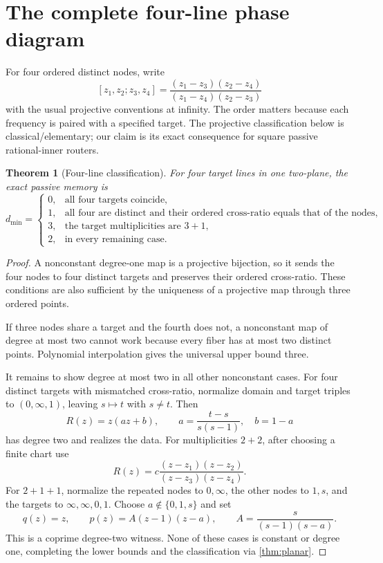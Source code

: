 \documentclass[11pt]{article}
\newtheorem{theorem}{Theorem}[section]
\theoremstyle{definition}\newtheorem{definition}[theorem]{Definition}\newtheorem{example}[theorem]{Example}
\theoremstyle{remark}\newtheorem{remark}[theorem]{Remark}\newtheorem{limitation}[theorem]{Limitation}
\begin{document}
\section{The complete four-line phase diagram}

For four ordered distinct nodes, write
\[
 [z_1,z_2;z_3,z_4]
 =\frac{(z_1-z_3)(z_2-z_4)}{(z_1-z_4)(z_2-z_3)}
\]
with the usual projective conventions at infinity.  The order matters because
each frequency is paired with a specified target.
The projective classification below is classical/elementary; our claim is its
exact consequence for square passive rational-inner routers.

\begin{theorem}[Four-line classification]\label{thm:four}
For four target lines in one two-plane, the exact passive memory is
\begin{equation}\label{eq:four}
d_{\min}=\begin{cases}
0,&\text{all four targets coincide},\\
1,&\text{all four are distinct and their ordered cross-ratio equals that of the nodes},\\
3,&\text{the target multiplicities are }3+1,\\
2,&\text{in every remaining case.}
\end{cases}
\end{equation}
\end{theorem}

\begin{proof}
A nonconstant degree-one map is a projective bijection, so it sends the four
nodes to four distinct targets and preserves their ordered cross-ratio.  These
conditions are also sufficient by the uniqueness of a projective map through
three ordered points.

If three nodes share a target and the fourth does not, a nonconstant map of
degree at most two cannot work because every fiber has at most two distinct
points.  Polynomial interpolation gives the universal upper bound three.

It remains to show degree at most two in all other nonconstant cases.  For four
distinct targets with mismatched cross-ratio, normalize domain and target triples
to $(0,\infty,1)$, leaving $s\mapsto t$ with $s\ne t$.  Then
\[
 R(z)=z(az+b),\qquad
 a=\frac{t-s}{s(s-1)},\quad b=1-a
\]
has degree two and realizes the data.  For multiplicities $2+2$, after choosing
a finite chart use
\[
 R(z)=c\frac{(z-z_1)(z-z_2)}{(z-z_3)(z-z_4)}.
\]
For $2+1+1$, normalize the repeated nodes to $0,\infty$, the other nodes to
$1,s$, and the targets to $\infty,\infty,0,1$.  Choose
$a\notin\{0,1,s\}$ and set
\[
 q(z)=z,\qquad p(z)=A(z-1)(z-a),\qquad
 A=\frac{s}{(s-1)(s-a)}.
\]
This is a coprime degree-two witness.  None of these cases is constant or
degree one, completing the lower bounds and the classification via
\cref{thm:planar}.
\end{proof}
\end{document}
